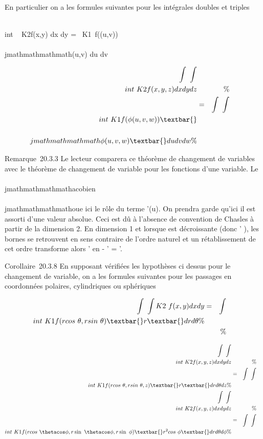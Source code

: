 En particulier on a les formules suivantes pour les intégrales doubles
et triples

\int  \\int ~
K2f(x,y) dx dy =\int ~
\int  K1~f(\phi(u,v))
\textbar{}\\\\jmathmathmathmath\phi(u,v)\textbar{} du dv

\begin{align*} \int ~
\int  \\int ~
K2f(x,y,z) dx dy dz&& \%&
\\ & =& \int ~
\int  \\int ~
K1f(\phi(u,v,w)) \textbar{}\\\\jmathmathmathmath\phi(u,v,w)\textbar{}
du dv dw\%& \\
\end{align*}

Remarque~20.3.3 Le lecteur comparera ce théorème de changement de
variables avec le théorème de changement de variable pour les fonctions
d'une variable. Le \\\\jmathmathmathmathacobien \\\\jmathmathmathmathoue ici le rôle du terme \phi'(u). On prendra
garde qu'ici il est assorti d'une valeur absolue. Ceci est dû à
l'absence de convention de Chasles à partir de la dimension 2. En
dimension 1 et lorsque \phi est décroissante (donc \phi' ), les bornes se
retrouvent en sens contraire de l'ordre naturel et un rétablissement de
cet ordre transforme alors \phi' en - \phi' = \textbar{}\phi'\textbar{}.

Corollaire~20.3.8 En supposant vérifiées les hypothèses ci dessus pour
le changement de variable, on a les formules suivantes pour les passages
en coordonnées polaires, cylindriques ou sphériques

\begin{align*} \int ~
\int  K2~f(x,y) dx dy& =&
\int  \\int ~
K1f(rcos~
\theta,rsin~ \theta) \textbar{}r\textbar{} dr d\theta\%&
\\ & & \%&
\\ \end{align*}

\begin{align*} \int ~
\int  \\int ~
K2f(x,y,z) dx dy dz&& \%&
\\ & =& \int ~
\int  \\int ~
K1f(rcos~
\theta,rsin~ \theta,z) \textbar{}r\textbar{} dr d\theta dz
\%& \\ \int ~
\int  \\int ~
K2f(x,y,z) dx dy dz&& \%&
\\ & =& \int ~
\int  \\int ~
K1f(rcos~
\thetacos \phi,r\sin~
\thetacos \phi,r\sin~ \phi)
\textbar{}r^2 cos~ \phi\textbar{} dr d\theta
d\phi\%& \\ \end{align*}

